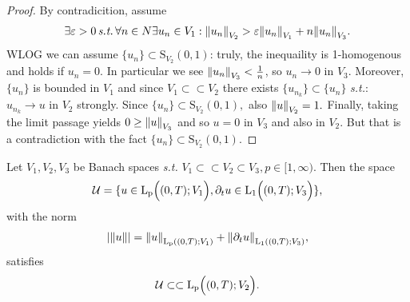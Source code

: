 \documentclass{article}
\begin{document}
\begin{proof}
	By contradicition, assume
	\[
		\exists \varepsilon >0 \, \text{\textit{s.t.}} \, \forall n \in N \exists u_n \in V_1: \norm{u_n}_{V_2} > \varepsilon \norm{u_n}_{V_1}+n \norm{u_n}_{V_3}.
	\]
	WLOG we can assume $\{u_n\} \subset \text{S}_{V_2}(0,1)$: truly, the inequaility is 1-homogenous and holds if $u_n = 0.$ In particular we see $\norm{u_n}_{V_3} < \frac{1}{n}$, so $u_n \to 0$ in $V_3.$ Moreover, $\{u_n\}$ is bounded in $V_1$ and since $V_1 \subset \subset V_2$ there exists $\{u_{n_k}\} \subset \{u_n\}$ \textit{s.t.}: $u_{n_k} \to u$ in $V_2$ strongly. Since $\{u_n\} \subset \text{S}_{V_2}(0,1),$ also $\norm{u}_{V_2} = 1.$ Finally, taking the limit passage yields $0 \geq \norm{u}_{V_3}$ and so $u = 0$ in $V_3$ and also in $V_2$. But that is a contradiction with the fact $\{u_n\} \subset \text{S}_{V_2}(0,1).$
\end{proof}
\begin{theorem}
	Let $V_1, V_2, V_3$ be Banach spaces \textit{s.t.} $V_1 \subset \subset V_2 \subset V_3, p \in [1, \infty).$ Then the space
	\[
		\mathcal{U} = \{u\in \text{L}_{\text{p}}\!\,\Bigl( (0,T);V_1 \Bigr),  \partial_t u \in \text{L}_{\text{1}}\!\,\Bigl( (0,T);V_3 \Bigr)\},
	\]
	with the norm
	\[
		|\norm{u}| = \norm{u}_{\text{L}_{\text{p}}\!\,\left( (0,T);V_1 \right)}+ \norm{\partial_t u}_{\text{L}_{\text{1}}\!\,\left( (0,T);V_3 \right)},
	\]
	satisfies
	\[
		\mathcal{U} \subset \subset \text{L}_{\text{p}}\!\,\Bigl( (0,T);V_2 \Bigr).
	\]
\end{theorem}
\end{document}
